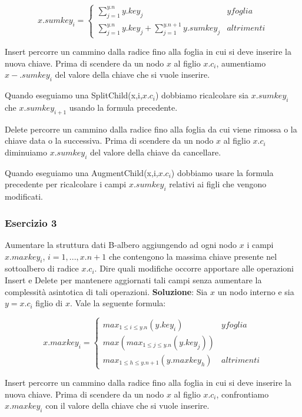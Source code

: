 $$x.sumkey_i=
\begin{cases}
\sum_{j=1}^{y.n}y.key_j & y foglia \\
\sum_{j=1}^{y.n}y.key_j+\sum_{j=1}^{y.n+1}y.sumkey_j & altrimenti
\end{cases}
$$

Insert percorre un cammino dalla radice fino alla foglia in cui si deve inserire la nuova chiave. Prima di scendere da un nodo $x$ al figlio $x.c_i$, aumentiamo $x-.sumkey_i$ del valore della chiave che si vuole inserire.

Quando eseguiamo una SplitChild(x,i,$x.c_i$) dobbiamo ricalcolare sia $x.sumkey_i$ che $x.sumkey_{i+1}$ usando la formula precedente.

Delete percorre un cammino dalla radice fino alla foglia da cui viene rimossa o la chiave data o la successiva. Prima di scendere da un nodo $x$ al figlio $x.c_i$ diminuiamo $x.sumkey_i$ del valore della chiave da cancellare.

Quando eseguiamo una AugmentChild(x,i,$x.c_i$) dobbiamo usare la formula precedente per ricalcolare i campi $x.sumkey_i$ relativi ai figli che vengono modificati.

\subsubsection{Esercizio 3}

Aumentare la struttura dati B-albero aggiungendo ad ogni nodo $x$ i campi $x.maxkey_i$, $i=1,...,x.n+1$ che contengono la massima chiave presente nel sottoalbero di radice $x.c_i$. Dire quali modifiche occorre apportare alle operazioni Insert e Delete per mantenere aggiornati tali campi senza aumentare la complessità asintotica di tali operazioni.
\linebreak
\linebreak
\textbf{Soluzione}: Sia $x$ un nodo interno e sia $y=x.c_i$ figlio di $x$. Vale la seguente formula:

$$
x.maxkey_i=
\begin{cases}

max_{1\le i \le y.n}(y.key_i) & y foglia \\
max(max_{1\le j \le y.n}(y.key_j)) \\
max_{1\le h \le y.n+1}(y.maxkey_h) & altrimenti

\end{cases}
$$

Insert percorre un cammino dalla radice fino alla foglia in cui si deve inserire la nuova chiave. Prima di scendere da un nodo $x$ al figlio $x.c_i$, confrontiamo $x.maxkey_i$ con il valore della chiave che si vuole inserire.

